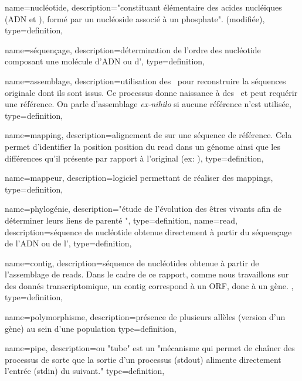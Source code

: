  {
    name=nucléotide,
    description={"constituant élémentaire des acides nucléiques (ADN et \ARN), formé par un nucléoside associé à un phosphate". \cite{Robert} (modifiée)},
    type=definition,
}


 {
    name=séquençage,
    description={détermination de l'ordre des \gls{nucléotide} composant une molécule d'ADN ou d'\ARN},
    type=definition,
}

 {
    name=assemblage,
    description={utilisation des \reads pour reconstruire la séquences originale dont ils sont issus. Ce processus donne naissance à des \contigs et peut requérir une référence. On parle d'assemblage \textit{ex-nihilo} si aucune référence n'est utilisée},
    type=definition,
}

 {
    name=mapping,
    description={alignement de \reads sur une séquence de référence. Cela permet d'identifier la position position du \gls{read} dans un génome ainsi que les différences qu'il présente par rapport à l'original (ex: \SNP)},
    type=definition,
}

 {
    name=mappeur,
    description={logiciel permettant de réaliser des \glspl{mapping}},
    type=definition,
}

 {
    name=phylogénie,
    description={"étude de l’évolution des êtres vivants afin de déterminer leurs liens de parenté \cite{LeDico}"},
    type=definition,
}
 {
    name=read,
    description={séquence de \gls{nucléotide} obtenue directement à partir du \gls{séquençage} de l'ADN ou de l'\ARN},
    type=definition,
}
\newcommand{\reads}{\glspl{read}}

 {
    name=contig,
    description={séquence de \glspl{nucléotide} obtenue à partir de l'\gls{assemblage} de \reads. Dans le cadre de ce rapport, comme nous travaillons sur des donnés \gls{transcriptomique}, un \gls{contig} correspond à un \acrfull{ORF}, donc à un gène.  },
    type=definition,
}
\newcommand{\contig}{\gls{contig}}
\newcommand{\contigs}{\glspl{contig}}

 {
    name=polymorphisme,
    description={présence de plusieurs allèles (version d'un gène) au sein d'une population}
    type=definition,
}


 {
    name=pipe,
    description={ou "tube" est un "mécanisme qui permet de chaîner des processus de sorte que la sortie d'un processus (stdout) alimente directement l'entrée (stdin) du suivant." \cite{LeDico}}
     type=definition,
}
\newcommand{\pipe}{\gls{pipe}}

